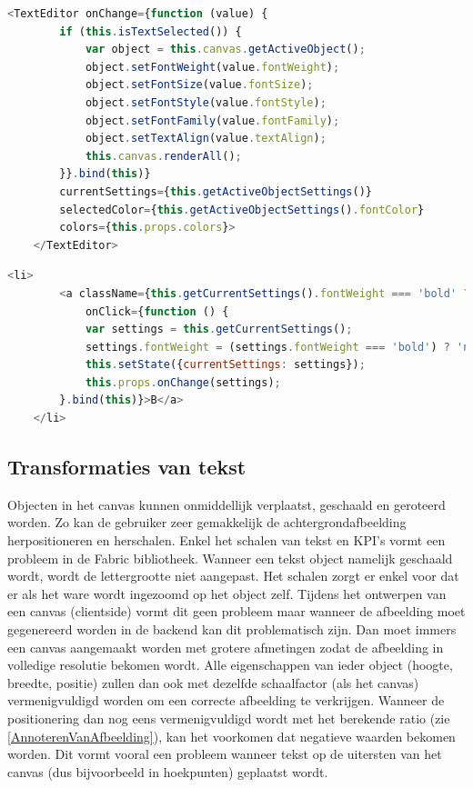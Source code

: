 \begin{lstlisting}[caption={Theme component - Text editor},label=lst:ThemeComponentTextEditor,language=javascript]
	<TextEditor onChange={function (value) {
		if (this.isTextSelected()) {
			var object = this.canvas.getActiveObject();
			object.setFontWeight(value.fontWeight);
			object.setFontSize(value.fontSize);
			object.setFontStyle(value.fontStyle);
			object.setFontFamily(value.fontFamily);
			object.setTextAlign(value.textAlign);
			this.canvas.renderAll();
		}}.bind(this)}
		currentSettings={this.getActiveObjectSettings()}
		selectedColor={this.getActiveObjectSettings().fontColor}
		colors={this.props.colors}>
	</TextEditor>
\end{lstlisting}

\begin{lstlisting}[caption={TextEditor component - Tekst in het vet plaatsen},label=lst:TextEditorComponentBold,language=javascript]
	<li>
		<a className={this.getCurrentSettings().fontWeight === 'bold' ? 'button primary' : 'button'}
			onClick={function () {
			var settings = this.getCurrentSettings();
			settings.fontWeight = (settings.fontWeight === 'bold') ? 'normal' : 'bold';
			this.setState({currentSettings: settings});
			this.props.onChange(settings);
		}.bind(this)}>B</a>
	</li>
\end{lstlisting}


\subsection{Transformaties van tekst}
Objecten in het canvas kunnen onmiddellijk verplaatst, geschaald en geroteerd worden. Zo kan de gebruiker zeer gemakkelijk de achtergrondafbeelding herpositioneren en herschalen. Enkel het schalen van tekst en KPI's vormt een probleem in de Fabric bibliotheek. Wanneer een tekst object namelijk geschaald wordt, wordt de lettergrootte niet aangepast. Het schalen zorgt er enkel voor dat er als het ware wordt ingezoomd op het object zelf. Tijdens het ontwerpen van een canvas (clientside) vormt dit geen probleem maar wanneer de afbeelding moet gegenereerd worden in de backend kan dit problematisch zijn. Dan moet immers een canvas aangemaakt worden met grotere afmetingen zodat de afbeelding in volledige resolutie bekomen wordt.  Alle eigenschappen van ieder object (hoogte, breedte, positie) zullen dan ook met dezelfde schaalfactor (als het canvas) vermenigvuldigd worden om een correcte afbeelding te verkrijgen. Wanneer de positionering dan nog eens vermenigvuldigd wordt met het berekende ratio (zie \ref{AnnoterenVanAfbeelding}), kan het voorkomen dat negatieve waarden bekomen worden. Dit vormt vooral een probleem wanneer tekst op de uitersten van het canvas (dus bijvoorbeeld in hoekpunten) geplaatst wordt. 

